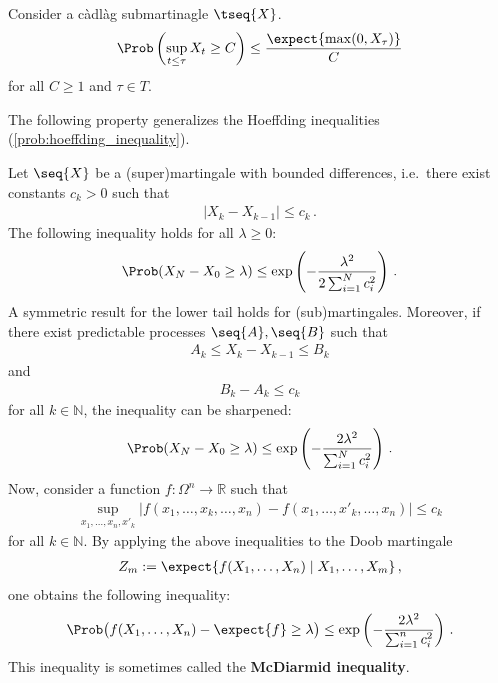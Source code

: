     \begin{property}\label{prob:doob_inequality}
        Consider a c\`adl\`ag submartinagle $\tseq{X}$.
        \begin{gather}
            \Prob\left(\sup_{t\leq\tau}X_t\geq C\right)\leq\frac{\expect{\max(0,X_\tau)}}{C}
        \end{gather}
        for all $C\geq1$ and $\tau\in T$.
    \end{property}

    The following property generalizes the Hoeffding inequalities (\cref{prob:hoeffding_inequality}).
    \begin{property}\label{prob:hoeffding_azuma}
        Let $\seq{X}$ be a (super)martingale with bounded differences, i.e.~there exist constants $c_k>0$ such that
        \begin{gather}
            |X_k-X_{k-1}|\leq c_k\,.
        \end{gather}
        The following inequality holds for all $\lambda\geq0$:
        \begin{gather}
            \Prob(X_N-X_0\geq\lambda)\leq\exp\left(-\frac{\lambda^2}{2\sum_{i=1}^Nc_i^2}\right)\,.
        \end{gather}
        A symmetric result for the lower tail holds for (sub)martingales. Moreover, if there exist predictable processes $\seq{A},\seq{B}$ such that
        \begin{gather}
            A_k\leq X_k-X_{k-1}\leq B_k
        \end{gather}
        and
        \begin{gather}
            B_k-A_k\leq c_k
        \end{gather}
        for all $k\in\mathbb{N}$, the inequality can be sharpened:
        \begin{gather}
            \Prob(X_N-X_0\geq\lambda)\leq\exp\left(-\frac{2\lambda^2}{\sum_{i=1}^Nc_i^2}\right)\,.
        \end{gather}
        Now, consider a function $f:\Omega^n\rightarrow\mathbb{R}$ such that
        \begin{gather}
            \sup_{x_1,\ldots,x_n,x'_k}|f(x_1,\ldots,x_k,\ldots,x_n)-f(x_1,\ldots,x'_k,\ldots,x_n)|\leq c_k
        \end{gather}
        for all $k\in\mathbb{N}$. By applying the above inequalities to the Doob martingale
        \begin{gather}
            Z_m:=\expect{f(X_1,\ldots,X_n)\mid X_1,\ldots,X_m}\,,
        \end{gather}
        one obtains the following inequality:
        \begin{gather}
            \Prob\bigl(f(X_1,\ldots,X_n)-\expect{f}\geq\lambda\bigr)\leq\exp\left(-\frac{2\lambda^2}{\sum_{i=1}^nc_i^2}\right)\,.
        \end{gather}
        This inequality is sometimes called the \textbf{McDiarmid inequality}.
    \end{property}

